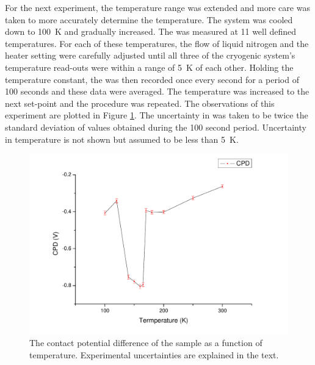 For the next experiment, the temperature range was extended and more care was taken to more accurately determine the temperature. The system was cooled down to \SI{100}{\kelvin} and gradually increased. The \cpd{} was measured at 11 well defined temperatures. For each of these temperatures, the flow of liquid nitrogen and the heater setting were carefully adjusted until all three of the cryogenic system's temperature read-outs were within a range of \SI{5}{\kelvin} of each other. Holding the temperature constant, the \cpd{} was then recorded once every second for a period of 100 seconds and these data were averaged. The temperature was increased to the next set-point and the procedure was repeated. The observations of this experiment are plotted in Figure \ref{fig:vox2}. The uncertainty in \cpd{} was taken to be twice the standard deviation of \cpd{} values obtained during the 100 second period. Uncertainty in temperature is not shown but assumed to be less than \SI{5}{\kelvin}.\\
\begin{figure}
\centering
	\includegraphics[width=0.8\linewidth]{./figs/vox2}
	\caption{The contact potential difference of the \wvadiox{} sample as a function of temperature. Experimental uncertainties are explained in the text.}
	\label{fig:vox2}
\end{figure}

